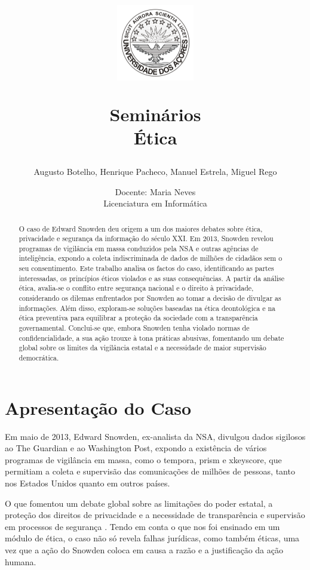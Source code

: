 \documentclass[a4paper,12pt]{article}
\title{
    \vspace{-1cm} 
    \begin{figure}[H]
        \centering
        \includegraphics[width=0.3\textwidth]{./images/uac_logo.png}
    \end{figure}
    \vspace{0.5cm} 
    \textbf{Seminários}
    \\
    Ética
}
\author{Augusto Botelho, Henrique Pacheco, Manuel Estrela, Miguel Rego}
\date{Docente: Maria Neves \\ \vspace{0.5cm}Licenciatura em Informática }
\begin{document}
\maketitle

\begin{abstract}
O caso de Edward Snowden deu origem a um dos maiores debates sobre ética, privacidade e segurança da informação do século XXI. Em 2013, Snowden revelou programas de vigilância em massa conduzidos pela NSA e outras agências de inteligência, expondo a coleta indiscriminada de dados de milhões de cidadãos sem o seu consentimento. Este trabalho analisa os factos do caso, identificando as partes interessadas, os princípios éticos violados e as suas consequências. A partir da análise ética, avalia-se o conflito entre segurança nacional e o direito à privacidade, considerando os dilemas enfrentados por Snowden ao tomar a decisão de divulgar as informações. Além disso, exploram-se soluções baseadas na ética deontológica e na ética preventiva para equilibrar a proteção da sociedade com a transparência governamental. Conclui-se que, embora Snowden tenha violado normas de confidencialidade, a sua ação trouxe à tona práticas abusivas, fomentando um debate global sobre os limites da vigilância estatal e a necessidade de maior supervisão democrática.
\end{abstract}

\newpage
\tableofcontents

\newpage

\section{Apresentação do Caso}

Em maio de 2013, Edward Snowden, ex-analista da NSA, divulgou dados sigilosos ao The Guardian e ao Washington Post, expondo a existência de vários programas de vigilância em massa, como o \gls{tempora}, \gls{prism} e \gls{xkeyscore}, que permitiam a coleta e supervisão das comunicações de milhões de pessoas, tanto nos Estados Unidos quanto em outros países.

O que fomentou um debate global sobre as limitações do poder estatal, a proteção dos direitos de privacidade e a necessidade de transparência e supervisão em processos de segurança \cite{teresa}.
Tendo em conta o que nos foi ensinado em um módulo de ética, o caso não só revela falhas jurídicas, como também éticas, uma vez que a ação do Snowden coloca em causa a razão e a justificação da ação humana. 
\end{document}
